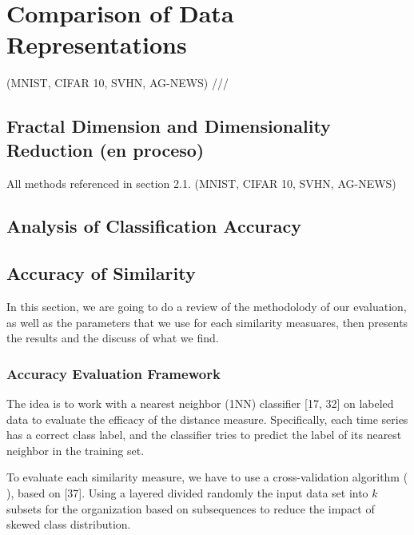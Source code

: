 \documentclass{article}
\begin{document}
   
\section{Comparison of Data Representations} %
   
      (MNIST, CIFAR 10, SVHN, AG-NEWS) ///
   \subsection{Fractal Dimension and Dimensionality Reduction (en proceso)}
      	All methods referenced in section 2.1. (MNIST, CIFAR 10, SVHN, AG-NEWS)
   \subsection{Analysis of Classification Accuracy}
 


\subsection{Accuracy of Similarity} %

In this section, we are going to do a review of the methodolody of our evaluation, as well as the parameters that we use for each similarity measuares, then presents the results and the discuss of what we find.

\subsubsection{Accuracy Evaluation Framework}

      
The idea is to work with a nearest neighbor (1NN) classifier [17, 32] on labeled data to evaluate the efficacy of the distance measure. Specifically, each time series has a correct class label, and the classifier tries to predict the label of its nearest neighbor in the training set.  

To evaluate each similarity measure, we have to use a cross-validation algorithm ( ), based on [37]. Using a layered divided randomly the input data set into $k$ subsets for the organization based on subsequences to reduce the impact of skewed class distribution. 
\end{document}
